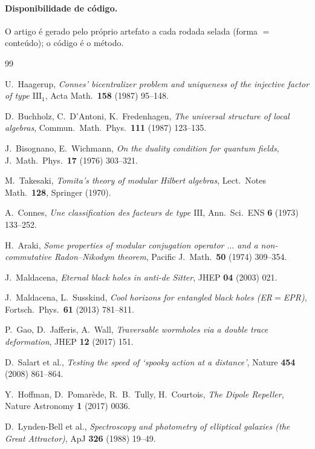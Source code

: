 \documentclass[11pt]{article}
\theoremstyle{definition}\newtheorem{deriv}{Derivação}
\begin{document}
\paragraph{Disponibilidade de código.} O artigo é gerado pelo próprio artefato a cada rodada selada (forma $=$ conteúdo); o código é o método.

\begin{thebibliography}{99}\small\setlength{\itemsep}{0pt}

 U.~Haagerup, \emph{Connes' bicentralizer problem and uniqueness of the injective factor of type $\mathrm{III}_1$}, Acta Math.\ \textbf{158} (1987) 95--148.

 D.~Buchholz, C.~D'Antoni, K.~Fredenhagen, \emph{The universal structure of local algebras}, Commun.\ Math.\ Phys.\ \textbf{111} (1987) 123--135.

 J.~Bisognano, E.~Wichmann, \emph{On the duality condition for quantum fields}, J.\ Math.\ Phys.\ \textbf{17} (1976) 303--321.

 M.~Takesaki, \emph{Tomita's theory of modular Hilbert algebras}, Lect.\ Notes Math.\ \textbf{128}, Springer (1970).

 A.~Connes, \emph{Une classification des facteurs de type $\mathrm{III}$}, Ann.\ Sci.\ ENS \textbf{6} (1973) 133--252.

 H.~Araki, \emph{Some properties of modular conjugation operator $\ldots$ and a non-commutative Radon--Nikodym theorem}, Pacific J.\ Math.\ \textbf{50} (1974) 309--354.

 J.~Maldacena, \emph{Eternal black holes in anti-de Sitter}, JHEP \textbf{04} (2003) 021.

 J.~Maldacena, L.~Susskind, \emph{Cool horizons for entangled black holes (ER$=$EPR)}, Fortsch.\ Phys.\ \textbf{61} (2013) 781--811.

 P.~Gao, D.~Jafferis, A.~Wall, \emph{Traversable wormholes via a double trace deformation}, JHEP \textbf{12} (2017) 151.

 D.~Salart et al., \emph{Testing the speed of `spooky action at a distance'}, Nature \textbf{454} (2008) 861--864.

 Y.~Hoffman, D.~Pomarède, R.~B.~Tully, H.~Courtois, \emph{The Dipole Repeller}, Nature Astronomy \textbf{1} (2017) 0036.

 D.~Lynden-Bell et al., \emph{Spectroscopy and photometry of elliptical galaxies (the Great Attractor)}, ApJ \textbf{326} (1988) 19--49.


\end{thebibliography}
\end{document}
